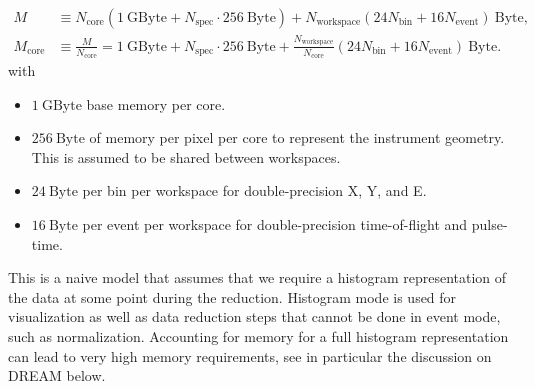 \documentclass[a4paper,english,numbers=noenddot,bibliography=totoc,chapterprefix=on,DIV=12]{scrartcl}
\newcommand{\Treduction}{t_{\text{reduction}}}
\newcommand{\Trun}{t_{\text{run}}}
\newcommand{\Nbin}{N_{\text{bin}}}
\newcommand{\Ncore}{N_{\text{core}}}
\newcommand{\Nevent}{N_{\text{event}}}
\newcommand{\Nworkspace}{N_{\text{workspace}}}
\newcommand{\Nspec}{N_{\text{spec}}}
\newcommand{\Mcore}{M_{\text{core}}}
\newcommand{\beer}{BEER\xspace}
\newcommand{\dream}{DREAM\xspace}
\begin{document}
\begin{align}
  \label{eq:ram}
  M &\equiv \Ncore(1~\mathrm{GByte} + \Nspec \cdot 256~\mathrm{Byte}) + N_{\text{workspace}}(24\Nbin + 16\Nevent)~\mathrm{Byte},\\
  \Mcore &\equiv \frac{M}{\Ncore} = 1~\mathrm{GByte} + \Nspec \cdot 256~\mathrm{Byte} + \frac{\Nworkspace}{\Ncore}(24\Nbin + 16\Nevent)~\mathrm{Byte}.
\end{align}
with
\begin{itemize}
  \item $1~\mathrm{GByte}$ base memory per core.
  \item $256~\mathrm{Byte}$ of memory per pixel per core to represent the instrument geometry.
    This is assumed to be shared between workspaces.
  \item $24~\mathrm{Byte}$ per bin per workspace for double-precision X, Y, and E.
  \item $16~\mathrm{Byte}$ per event per workspace for double-precision time-of-flight and pulse-time.
\end{itemize}
This is a naive model that assumes that we require a histogram representation of the data at some point during the reduction.
Histogram mode is used for visualization as well as data reduction steps that cannot be done in event mode, such as normalization.
Accounting for memory for a full histogram representation can lead to very high memory requirements, see in particular the discussion on \dream below.

\begin{table}
  \scriptsize
  
  \caption{\label{tab:hardware-beer}
Example estimate of hardware required for script-based reduction for \beer.
In this and the following tables, the `Pixels' column refers to the build-out phase.
`Use' is a guess of the fraction a particular instrument mode/configuration is used.
The values are chosen to add up to 100\% but could be adjusted to take into account time without beam and time for changing samples.
If the obtainable $\Treduction$ violates the conditions such as a $5\times$ speedup stated in Sec.~\ref{sec:scaling-analysis} the corresponding $\Trun$ in the table is highlighted in \textcolor{red}{red}.\\
For \beer the biggest uncertainty comes from the duration of a single run.
The measurement time for each individual measurement point in the sample can be very low.
If each such point is considered as an independent measurement we obtain a high hardware cost, especially in \emph{high-flux-multiplexing} mode.
If a combined treatment of the points in the sample scan is possible the requirement is likely to be much lower in the high-flux case.
For the \emph{high-flux-multiplexing} mode $\Trun$ looks unrealistic (below the pulse length), yielding an enormous core count.
The rate given by the instrument team for this mode is two orders of magnitude above the stated average rate so our naive computation of $\Trun$ may not correspond to the actual use case, i.e., the result should be interpreted with care.
For the \emph{medium-flux-multiplexing} mode we do not have an actual statement of the event rate but we have chosen to include it as an estimate for an intermediate case.
}
\end{table}
\end{document}

